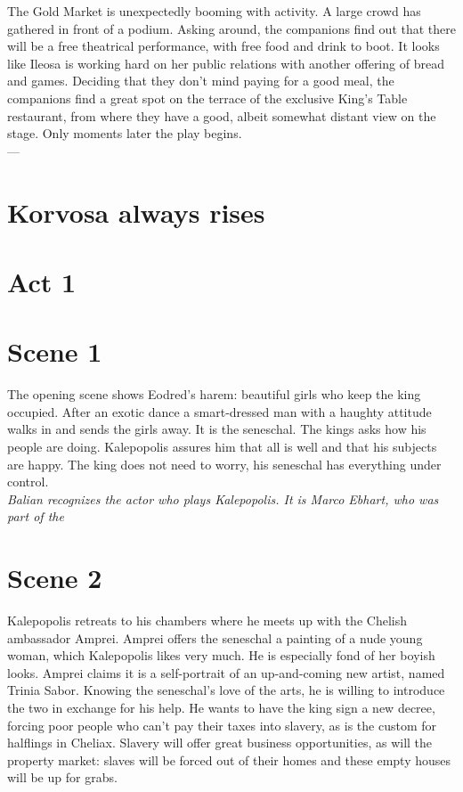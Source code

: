 The Gold Market is unexpectedly booming with activity. A large crowd has gathered in front of a podium. Asking around, the companions find out that there will be a free theatrical performance, with free food and drink to boot. It looks like Ileosa is working hard on her public relations with another offering of bread and games. Deciding that they don't mind paying for a good meal, the companions find a great spot on the terrace of the exclusive King's Table restaurant, from where they have a good, albeit somewhat distant view on the stage. Only moments later the play begins.\\

---\\

\section{Korvosa always rises}

\section{Act 1}

\section{Scene 1}

The opening scene shows Eodred's harem: beautiful girls who keep the king occupied. After an exotic dance a smart-dressed man with a haughty attitude walks in and sends the girls away. It is the seneschal. The kings asks how his people are doing. Kalepopolis assures him that all is well and that his subjects are happy. The king does not need to worry, his seneschal has everything under control.\\

 {\itshape Balian recognizes the actor who plays Kalepopolis. It is Marco Ebhart, who was part of the}  \section{Scene 2}

Kalepopolis retreats to his chambers where he meets up with the Chelish ambassador Amprei. Amprei offers the seneschal a painting of a nude young woman, which Kalepopolis likes very much. He is especially fond of her boyish looks. Amprei claims it is a self-portrait of an up-and-coming new artist, named Trinia Sabor. Knowing the seneschal's love of the arts, he is willing to introduce the two in exchange for his help. He wants to have the king sign a new decree, forcing poor people who can't pay their taxes into slavery, as is the custom for halflings in Cheliax. Slavery will offer great business opportunities, as will the property market: slaves will be forced out of their homes and these empty houses will be up for grabs.\\

